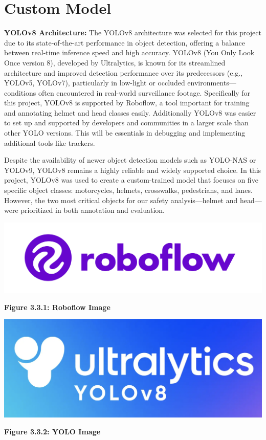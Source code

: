 \section{Custom Model}
\textbf{YOLOv8 Architecture:}
The YOLOv8 architecture was selected for this project due to its state-of-the-art performance in object detection, offering a balance between real-time inference speed and high accuracy. YOLOv8 (You Only Look Once version 8), developed by Ultralytics, is known for its streamlined architecture and improved detection performance over its predecessors (e.g., YOLOv5, YOLOv7), particularly in low-light or occluded environments—conditions often encountered in real-world surveillance footage. Specifically for this project, YOLOv8 is supported by Roboflow, a tool important for training and annotating helmet and head classes easily. Additionally YOLOv8 was easier to set up and supported by developers and communities in a larger scale than other YOLO versions. This will be essentials in debugging and implementing additional tools like trackers. 

Despite the availability of newer object detection models such as YOLO-NAS or YOLOv9, YOLOv8 remains a highly reliable and widely supported choice. In this project, YOLOv8 was used to create a custom-trained model that focuses on five specific object classes: motorcycles, helmets, crosswalks, pedestrians, and lanes. However, the two most critical objects for our safety analysis—helmet and head—were prioritized in both annotation and evaluation.


\begin{center}
	\begin{minipage}{0.45\textwidth}
		\centering
		\includegraphics[width=\linewidth]{roboflow.png}
		\vspace{0.5em}
		
		\textbf{Figure 3.3.1: Roboflow Image}
	\end{minipage}
	\hfill
	\begin{minipage}{0.45\textwidth}
		\centering
		\includegraphics[width=\linewidth]{yolo.png}
		\vspace{0.5em}
		
		\textbf{Figure 3.3.2: YOLO Image}
	\end{minipage}
\end{center}

